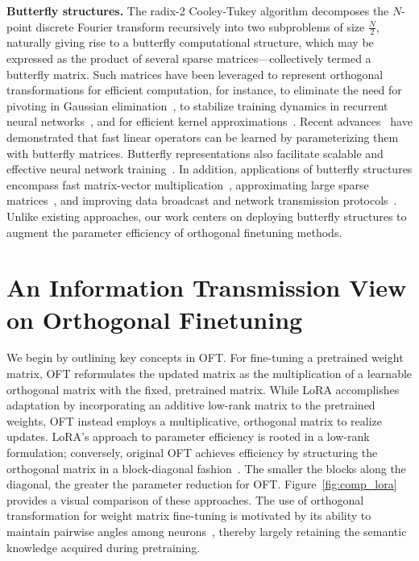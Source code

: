 \textbf{Butterfly structures.} The radix-2 Cooley-Tukey algorithm decomposes the $N$-point discrete Fourier transform recursively into two subproblems of size $\frac{N}{2}$, naturally giving rise to a butterfly computational structure, which may be expressed as the product of several sparse matrices—collectively termed a butterfly matrix. Such matrices have been leveraged to represent orthogonal transformations for efficient computation, for instance, to eliminate the need for pivoting in Gaussian elimination~\cite{parker1995random}, to stabilize training dynamics in recurrent neural networks~\cite{jing2017tunable}, and for efficient kernel approximations~\cite{munkhoeva2018quadrature}. Recent advances~\cite{dao2019learning,dao2019kaleidoscope} have demonstrated that fast linear operators can be learned by parameterizing them with butterfly matrices. Butterfly representations also facilitate scalable and effective neural network training~\cite{chen2022pixelated,dao2022monarch}. In addition, applications of butterfly structures encompass fast matrix-vector multiplication~\cite{michielssen1996multilevel,o2010algorithm}, approximating large sparse matrices~\cite{li2015butterfly}, and improving data broadcast and network transmission protocols~\cite{klasing1994broadcasting,li2003linear,rajasingh2016transmission}. Unlike existing approaches, our work centers on deploying butterfly structures to augment the parameter efficiency of orthogonal finetuning methods.

\section{An Information Transmission View on Orthogonal Finetuning}

We begin by outlining key concepts in OFT. For fine-tuning a pretrained weight matrix, OFT reformulates the updated matrix as the multiplication of a learnable orthogonal matrix with the fixed, pretrained matrix. While LoRA accomplishes adaptation by incorporating an additive low-rank matrix to the pretrained weights, OFT instead employs a multiplicative, orthogonal matrix to realize updates. LoRA's approach to parameter efficiency is rooted in a low-rank formulation; conversely, original OFT achieves efficiency by structuring the orthogonal matrix in a block-diagonal fashion~\cite{qiu2023controlling}. The smaller the blocks along the diagonal, the greater the parameter reduction for OFT. Figure~\ref{fig:comp_lora} provides a visual comparison of these approaches. The use of orthogonal transformation for weight matrix fine-tuning is motivated by its ability to maintain pairwise angles among neurons~\cite{liu2018learning,liu2021orthogonal,qiu2023controlling}, thereby largely retaining the semantic knowledge acquired during pretraining. 


